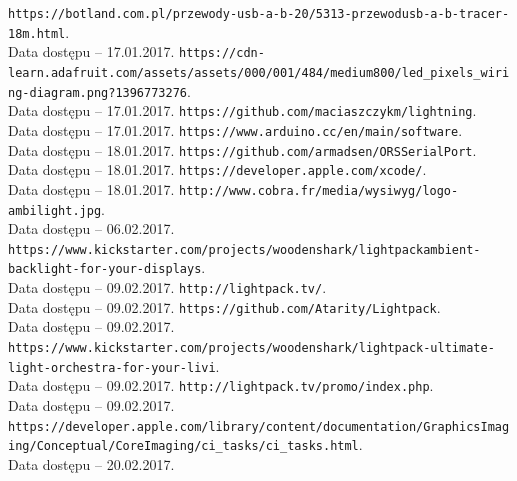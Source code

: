 \documentclass[12pt]{report}
\begin{document}
\begin{thebibliography}{99}
 {\tt https://botland.com.pl/przewody-usb-a-b-20/5313-przewod\-usb-a-b-tracer-18m.html}.\\Data dostępu -- 17.01.2017.
 {\tt https://cdn-learn.adafruit.com/assets/assets/000/001/484/\-medium800/led\_pixels\_wiring-diagram.png?1396773276}.\\Data dostępu -- 17.01.2017.
 {\tt https://github.com/maciaszczykm/lightning}.\\Data dostępu -- 17.01.2017.
 {\tt https://www.arduino.cc/en/main/software}.\\Data dostępu -- 18.01.2017.
 {\tt https://github.com/armadsen/ORSSerialPort}.\\Data dostępu -- 18.01.2017.
 {\tt https://developer.apple.com/xcode/}.\\Data dostępu -- 18.01.2017.
 {\tt http://www.cobra.fr/media/wysiwyg/logo-ambilight.jpg}. \\Data dostępu -- 06.02.2017.
 {\tt https://www.kickstarter.com/projects/woodenshark/lightpack\-ambient-backlight-for-your-displays}. \\Data dostępu -- 09.02.2017.
 {\tt http://lightpack.tv/}. \\Data dostępu -- 09.02.2017.
 {\tt https://github.com/Atarity/Lightpack}. \\Data dostępu -- 09.02.2017.
 {\tt https://www.kickstarter.com/projects/woodenshark/lightpack-ultimate-light-orchestra-for-your-livi}. \\Data dostępu -- 09.02.2017.
 {\tt http://lightpack.tv/promo/index.php}. \\Data dostępu -- 09.02.2017.
 {\tt https://developer.apple.com/library/content/\-documentation/GraphicsImaging/Conceptual/CoreImaging/\-ci\_tasks/ci\_tasks.html}. \\Data dostępu -- 20.02.2017.
\end{thebibliography}

\listoffigures

\listoftables

\lstlistoflistings
\end{document}
